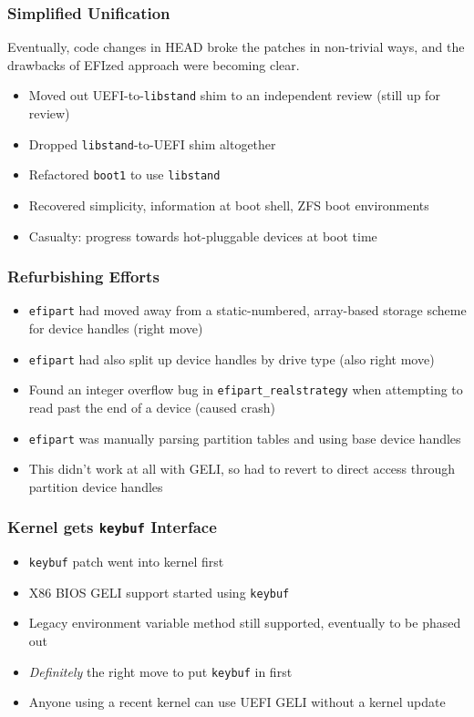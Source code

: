 \documentclass{beamer}
\begin{document}
\begin{frame}
  \frametitle{Simplified Unification}

  Eventually, code changes in HEAD broke the patches in non-trivial
  ways, and the drawbacks of EFIzed approach were becoming clear.
  \begin{itemize}
  \item Moved out UEFI-to-\texttt{libstand} shim to an independent
    review (still up for review)
  \item Dropped \texttt{libstand}-to-UEFI shim altogether
  \item Refactored \texttt{boot1} to use \texttt{libstand}
  \item Recovered simplicity, information at boot shell, ZFS boot environments
  \item Casualty: progress towards hot-pluggable devices at boot time
  \end{itemize}
\end{frame}

\begin{frame}
  \frametitle{Refurbishing Efforts}
  \begin{itemize}
  \item \texttt{efipart} had moved away from a static-numbered,
    array-based storage scheme for device handles (right move)
  \item \texttt{efipart} had also split up device handles by drive
    type (also right move)
  \item Found an integer overflow bug in
    \texttt{efipart\_realstrategy} when attempting to read past the
    end of a device (caused crash)
  \item \texttt{efipart} was manually parsing partition tables and
    using base device handles
  \item This didn't work at all with GELI, so had to revert to direct
    access through partition device handles
  \end{itemize}
\end{frame}

\begin{frame}
  \frametitle{Kernel gets \texttt{keybuf} Interface}
  \begin{itemize}
  \item \texttt{keybuf} patch went into kernel first
  \item X86 BIOS GELI support started using \texttt{keybuf}
  \item Legacy environment variable method still supported, eventually
    to be phased out
  \item \emph{Definitely} the right move to put \texttt{keybuf} in first
  \item Anyone using a recent kernel can use UEFI GELI without a
    kernel update
  \end{itemize}
\end{frame}
\end{document}
